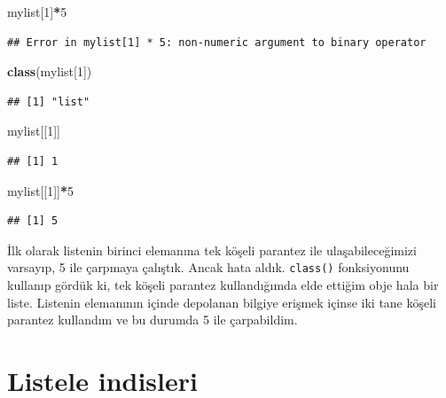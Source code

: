 \documentclass[
]{book}
\newenvironment{Shaded}{\begin{snugshade}}{\end{snugshade}}
\newcommand{\DecValTok}[1]{\textcolor[rgb]{0.00,0.00,0.81}{#1}}
\newcommand{\KeywordTok}[1]{\textcolor[rgb]{0.13,0.29,0.53}{\textbf{#1}}}
\newcommand{\NormalTok}[1]{#1}
\newcommand{\OperatorTok}[1]{\textcolor[rgb]{0.81,0.36,0.00}{\textbf{#1}}}
\begin{document}
\begin{Shaded}
\begin{Highlighting}[]
\NormalTok{mylist[}\DecValTok{1}\NormalTok{]}\OperatorTok{*}\DecValTok{5}
\end{Highlighting}
\end{Shaded}

\begin{verbatim}
## Error in mylist[1] * 5: non-numeric argument to binary operator
\end{verbatim}

\begin{Shaded}
\begin{Highlighting}[]
\KeywordTok{class}\NormalTok{(mylist[}\DecValTok{1}\NormalTok{])}
\end{Highlighting}
\end{Shaded}

\begin{verbatim}
## [1] "list"
\end{verbatim}

\begin{Shaded}
\begin{Highlighting}[]
\NormalTok{mylist[[}\DecValTok{1}\NormalTok{]]}
\end{Highlighting}
\end{Shaded}

\begin{verbatim}
## [1] 1
\end{verbatim}

\begin{Shaded}
\begin{Highlighting}[]
\NormalTok{mylist[[}\DecValTok{1}\NormalTok{]]}\OperatorTok{*}\DecValTok{5}
\end{Highlighting}
\end{Shaded}

\begin{verbatim}
## [1] 5
\end{verbatim}

İlk olarak listenin birinci elemanına tek köşeli parantez ile ulaşabileceğimizi varsayıp, 5 ile çarpmaya çalıştık. Ancak hata aldık. \texttt{class()} fonksiyonunu kullanıp gördük ki, tek köşeli parantez kullandığımda elde ettiğim obje hala bir liste. Listenin elemanının içinde depolanan bilgiye erişmek içinse iki tane köşeli parantez kullandım ve bu durumda 5 ile çarpabildim.

\hypertarget{listele-indisleri}{%
\section{Listele indisleri}\label{listele-indisleri}}
\end{document}
